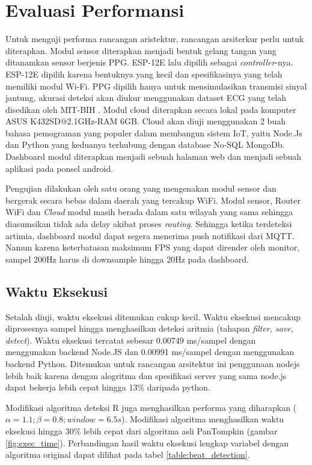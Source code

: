\documentclass[]{indojc_single}
\begin{document}
\section{Evaluasi Performansi}
Untuk menguji performa rancangan aristektur, rancangan arsiterkur perlu untuk diterapkan. Modul sensor diterapkan menjadi bentuk gelang tangan yang ditanamkan sensor berjenis PPG. ESP-12E lalu dipilih sebagai \textit{controller}-nya. ESP-12E dipilih karena bentuknya yang kecil dan spesifikasinya yang telah memiliki modul Wi-Fi. PPG dipilih hanya untuk mensimulasikan transmisi sinyal jantung, akurasi deteksi akan diukur menggunakan dataset ECG yang telah disedikan oleh MIT-BIH \cite{mit_bih_paper, physionet}. Modul cloud diterapkan secara lokal pada komputer ASUS K432SD@2.1GHz-RAM 6GB. Cloud akan diuji menggunakan 2 buah bahasa pemograman yang populer dalam membangun sistem IoT, yaitu Node.Js dan Python yang keduanya terhubung dengan database No-SQL MongoDb. Dashboard modul diterapkan menjadi sebuah halaman web dan menjadi sebuah aplikasi pada ponsel android.

Pengujian dilakukan oleh satu orang yang mengenakan modul sensor dan bergerak secara bebas dalam daerah yang tercakup WiFi. Modul sensor, Router WiFi dan \textit{Cloud} modul masih berada dalam satu wilayah yang sama sehingga diasumsikan tidak ada delay akibat proses \textit{routing}. Sehingga ketika terdeteksi artimia, dashboard modul dapat segera menerima push notifikasi dari MQTT. Namun karena keterbatasan maksimum FPS yang dapat dirender oleh monitor, sampel 200Hz harus di downsample hingga 20Hz pada dashboard.

\subsection{Waktu Eksekusi}
Setalah diuji, waktu eksekusi ditemukan cukup kecil. Waktu eksekusi mencakup diprosesnya sampel hingga menghasilkan deteksi aritmia (tahapan \textit{filter, save, detect}). Waktu eksekusi tercatat sebesar 0.00749 ms/sampel dengan menggunakan backend Node.JS dan 0.00991 ms/sampel dengan menggunakan backend Python. Ditemukan untuk rancangan arsitektur ini penggunaan nodejs lebih baik karena dengan alogritma dan spesifikasi server yang sama node.js dapat bekerja lebih cepat hingga 13\% daripada python.

Modifikasi algoritma deteksi R juga menghasilkan performa yang diharapkan ($\alpha = 1.1; \beta = 0.8; window = 6.5s$). Modifikasi algoritma menghasilkan waktu eksekusi hingga 30\% lebih cepat dari algoritma asli PanTompkin (gambar \ref{fig:exec_time}). Perbandingan hasil waktu eksekusi lengkap variabel dengan algoritma original dapat dilihat pada tabel \ref{table:beat_detection}.
\end{document}
